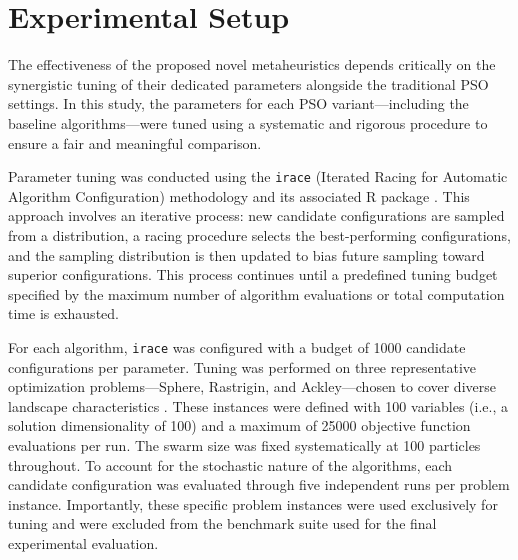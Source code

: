 {%








\section{Experimental Setup}


The effectiveness of the proposed novel \glspl{metaheuristic} depends critically on the synergistic tuning of their dedicated parameters alongside the traditional PSO settings. In this study, the parameters for each PSO variant---including the baseline algorithms---were tuned using a systematic and rigorous procedure to ensure a fair and meaningful comparison.

Parameter tuning was conducted using the \texttt{irace} (Iterated Racing for Automatic Algorithm Configuration) methodology and its associated R package \citep{lopezibanez2016irace}. This approach involves an iterative process: new candidate configurations are sampled from a distribution, a racing procedure selects the best-performing configurations, and the sampling distribution is then updated to bias future sampling toward superior configurations. This process continues until a predefined tuning budget specified by the maximum number of algorithm evaluations or total computation time is exhausted.

For each algorithm, \texttt{irace} was configured with a budget of 1000 candidate configurations per parameter. Tuning was performed on three representative optimization problems---Sphere, Rastrigin, and Ackley---chosen to cover diverse landscape characteristics \citep{los2018misfit}. These instances were defined with 100 variables (i.e., a solution dimensionality of 100) and a maximum of 25000 objective function evaluations per run. The swarm size was fixed systematically at 100 particles throughout. To account for the stochastic nature of the algorithms, each candidate configuration was evaluated through five independent runs per problem instance. Importantly, these specific problem instances were used exclusively for tuning and were excluded from the benchmark suite used for the final experimental evaluation.

}
